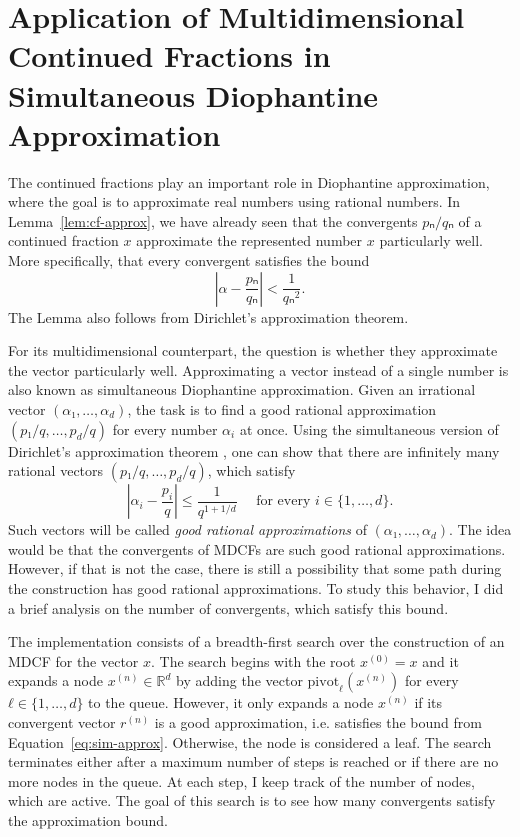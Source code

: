 \section{Application of Multidimensional Continued Fractions in Simultaneous Diophantine Approximation}

The continued fractions play an important role in Diophantine approximation,
where the goal is to approximate real numbers using rational numbers.
In Lemma~\vref{lem:cf-approx}, we have already seen that the convergents
$pₙ/qₙ$ of a continued fraction $x$ approximate the represented number $x$
particularly well.
More specifically, that every convergent satisfies the bound
\[
  \left|α - \frac{pₙ}{qₙ}\right| < \frac{1}{qₙ^2}.
\]
The Lemma also follows from Dirichlet's approximation theorem.

For its multidimensional counterpart,
the question is whether they approximate the vector particularly well.
Approximating a vector instead of a single number is also known as simultaneous
Diophantine approximation.
Given an irrational vector $(α₁, …, α_d)$, the task is to find a good
rational approximation $(p₁/q, …, p_d/q)$ for every number $α_i$ at once.
Using the simultaneous version of Dirichlet's approximation theorem \cite{Schmidt80},
one can show that there are infinitely many rational vectors $(p₁/q, …, p_d/q)$,
which satisfy
\begin{equation}
  \label{eq:sim-approx}
  \left|α_i - \frac{p_i}{q}\right| ≤ \frac{1}{q^{1 + 1/d}}
  \quad
  \text{ for every } i ∈ \{1, …, d\}.
\end{equation}
Such vectors will be called \emph{good rational approximations} of $(α₁, …, α_d)$.
The idea would be that the convergents of MDCFs are such good rational approximations.
However, if that is not the case, there is still a possibility that some path
during the construction has good rational approximations.
To study this behavior, I did a brief analysis on the number of convergents,
which satisfy this bound.

The implementation consists of a breadth-first search over the construction of an MDCF for the vector $x$.
The search begins with the root $x^{(0)} = x$ and it expands a node $x^{(n)} ∈ ℝ^d$
by adding the vector $\mathrm{pivot}_ℓ(x^{(n)})$ for every $ℓ ∈ \{1, …, d\}$ to the queue.
However, it only expands a node $x^{(n)}$
if its convergent vector $r^{(n)}$ is a good approximation,
i.e. satisfies the bound from Equation~\ref{eq:sim-approx}.
Otherwise, the node is considered a leaf.
The search terminates either after a maximum number of steps is reached or if
there are no more nodes in the queue.
At each step, I keep track of the number of nodes, which are active.
The goal of this search is to see how many convergents satisfy the
approximation bound.

